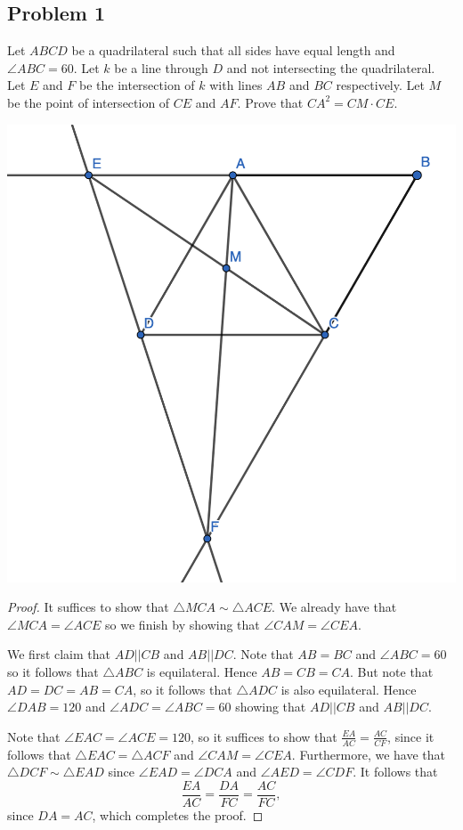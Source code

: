\documentclass[12pt]{scrartcl}
\newcommand{\<}{\langle}
\renewcommand{\>}{\rangle}
\begin{document}
\subsection{Problem 1}
\begin{Prob}
Let $ABCD$ be a quadrilateral such that all sides have equal length and $\angle ABC = 60$.  Let $k$ be a line through $D$ and not intersecting the quadrilateral.  Let $E$ and $F$ be the intersection of $k$ with lines $AB$ and $BC$ respectively.  Let $M$ be the point of intersection of $CE$ and $AF$.  Prove that $CA^2 = CM \cdot CE$. 
\end{Prob}
\begin{center}
\includegraphics[scale=0.4]{graphics/hw1-1.png}
\end{center}
\begin{proof}
It suffices to show that $\triangle MCA \sim \triangle ACE$.  We already have that $\angle MCA = \angle ACE$ so we finish by showing that $\angle CAM = \angle CEA$.

We first claim that $AD || CB$ and $AB || DC$.  Note that $AB = BC$ and $\angle ABC = 60$ so it follows that $\triangle ABC$ is equilateral.  Hence $AB = CB = CA$.  But note that $AD = DC = AB = CA$, so it follows that $\triangle ADC$ is also equilateral.  Hence $\angle DAB = 120$ and $\angle ADC = \angle ABC = 60$ showing that $AD || CB$ and $AB || DC$.

Note that $\angle EAC = \angle ACE = 120$, so it suffices to show that $\frac{EA}{AC} = \frac{AC}{CF}$, since it follows that $\triangle EAC = \triangle ACF$ and $\angle CAM = \angle CEA$.  Furthermore, we have that $\triangle DCF \sim \triangle EAD$ since $\angle EAD = \angle DCA$ and $\angle AED = \angle CDF$.  It follows that 
$$\frac{EA}{AC} = \frac{DA}{FC} = \frac{AC}{FC},$$
since $DA = AC$, which completes the proof.
\end{proof}
\end{document}
